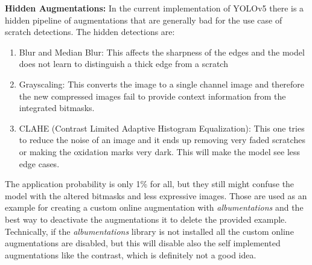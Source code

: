 \textbf{Hidden Augmentations:}
In the current implementation of YOLOv5 there is a hidden pipeline of augmentations that are generally bad for the use case of scratch detections. The hidden detections are:
\begin{enumerate}
\item Blur and Median Blur: This affects the sharpness of the edges and the model does not learn to distinguish a thick edge from a scratch
\item Grayscaling: This converts the image to a single channel image and therefore the new compressed images fail to provide context information from the integrated bitmasks.
\item CLAHE (Contrast Limited Adaptive Histogram Equalization): This one tries to reduce the noise of an image and it ends up removing very faded scratches or making the oxidation marks very dark. This will make the model see less edge cases. \\
\end{enumerate}
The application probability is only 1\% for all, but they still might confuse the model with the altered bitmasks and less expressive images. Those are used as an example for creating a custom online augmentation with \textit{albumentations} and the best way to deactivate the augmentations it to delete the provided example. Technically, if the \textit{albumentations} library is not installed all the custom online augmentations are disabled, but this will disable also the self implemented augmentations like the contrast, which is definitely not a good idea.



